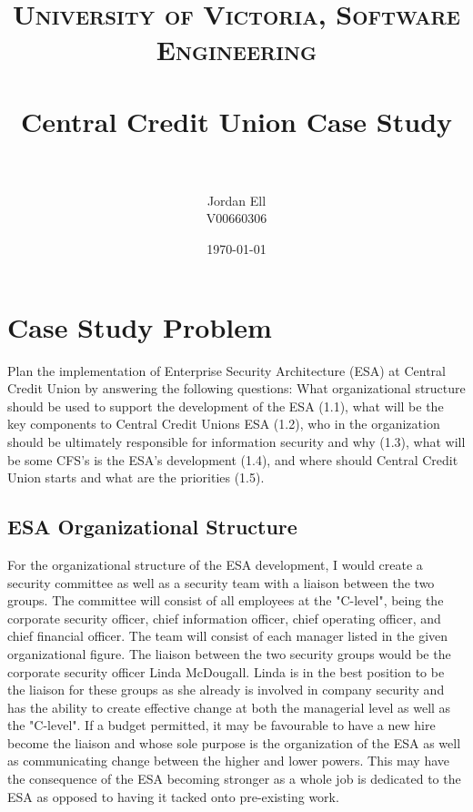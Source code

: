 \documentclass[paper=a4, fontsize=11pt]{scrartcl} %
\title{	
\normalfont \normalsize 
\textsc{University of Victoria, Software Engineering} \\ [25pt] %
\horrule{0.5pt} \\[0.4cm] %
\huge Central Credit Union Case Study \\ %
\horrule{2pt} \\[0.5cm] %
}
\author{Jordan Ell\\
V00660306} %
\date{\normalsize\today} %
\numberwithin{equation}{section} %
\numberwithin{figure}{section} %
\numberwithin{table}{section} %
\begin{document}
\maketitle %


\section{Case Study Problem}

Plan the implementation of Enterprise Security Architecture (ESA) at Central 
Credit Union by answering the following questions: What organizational 
structure should be used to support the development of the ESA (1.1), what will
be the key components to Central Credit Unions ESA (1.2), who in the organization
should be ultimately responsible for information security and why (1.3), what
will be some CFS's is the ESA's development (1.4), and where should Central 
Credit Union starts and what are the priorities (1.5).


\subsection{ESA Organizational Structure}
For the organizational structure of the ESA development, I would create a
security committee as well as a security team with a liaison between the 
two groups. The committee
will consist of all employees at the "C-level", being the corporate security
officer, chief information officer, chief operating officer, and chief
financial officer. The team will consist of each manager listed in the given
organizational figure. The liaison between the two security groups would be 
the corporate security officer Linda McDougall. Linda is in the best position
to be the liaison for these groups as she already is involved in company security
and has the ability to create effective change at both the managerial level
as well as the "C-level". If a budget permitted, it may be favourable to have
a new hire become the liaison and whose sole purpose is the organization of the
ESA as well as communicating change between the higher and lower powers. This
may have the consequence of the ESA becoming stronger as a whole job is dedicated
to the ESA as opposed to having it tacked onto pre-existing work.
\end{document}

